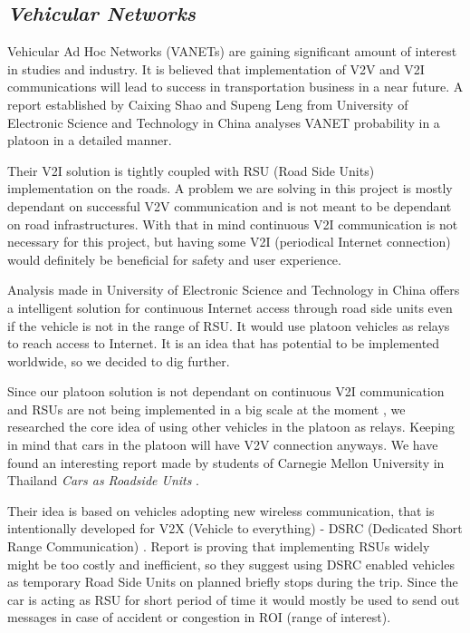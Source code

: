 \subsection{\textit{Vehicular Networks}}

% 
Vehicular Ad Hoc Networks (VANETs) are gaining significant amount of interest in studies and industry. It is believed that implementation of V2V and V2I communications will lead to success in transportation business in a near future. A report established by Caixing Shao and Supeng Leng from University of Electronic Science and Technology in China \cite{Shao2014AnalysisNetworks} analyses VANET probability in a platoon in a detailed manner.\par
% 
Their V2I solution is tightly coupled with RSU (Road Side Units) implementation on the roads. A problem we are solving in this project is mostly dependant on successful V2V communication and is not meant to be dependant on road infrastructures. With that in mind continuous V2I communication is not necessary for this project, but having some V2I (periodical Internet connection) would definitely be beneficial for safety and user experience.\par
% 
Analysis made in University of Electronic Science and Technology in China offers a intelligent solution for continuous Internet access through road side units even if the vehicle is not in the range of RSU. It would use platoon vehicles as relays to reach access to Internet. It is an idea that has potential to be implemented worldwide, so we decided to dig further.\par
% 
Since our platoon solution is not dependant on continuous V2I communication and RSUs are not being implemented in a big scale at the moment \cite{Tonguz2013CarsSolution}, we researched the core idea of using other vehicles in the platoon as relays. Keeping in mind that cars in the platoon will have V2V connection anyways. We have found an interesting report made by students of Carnegie Mellon University in Thailand \emph{Cars as Roadside Units} \cite{Tonguz2013CarsSolution}.\par
% 
Their idea is based on vehicles adopting new wireless communication, that is intentionally developed for V2X (Vehicle to everything) - DSRC (Dedicated Short Range Communication) \cite{OfficeoftheAssistantSecretaryforResearchandTechnologyIntelligentSheet}.
Report is proving that implementing RSUs widely might be too costly and inefficient, so they suggest using DSRC enabled vehicles as temporary Road Side Units on planned briefly stops during the trip. Since the car is acting as RSU for short period of time it would mostly be used to send out messages in case of accident or congestion in ROI (range of interest).